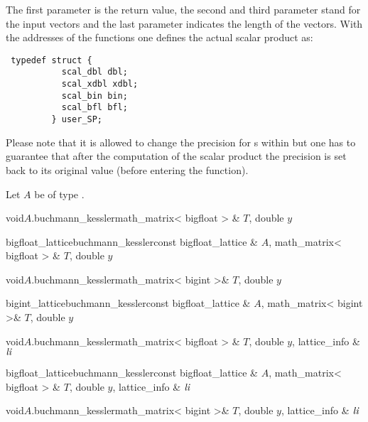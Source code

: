 The first parameter is the return value, the second and third parameter stand for the input
vectors and the last parameter indicates the length of the vectors.  With the addresses of the
functions one defines the actual scalar product as:
\begin{verbatim}
 typedef struct {
           scal_dbl dbl;
           scal_xdbl xdbl;
           scal_bin bin;
           scal_bfl bfl;
         } user_SP;
\end{verbatim}
Please note that it is allowed to change the precision for s within  but one has to guarantee that
after the computation of the scalar product the precision is set back to its original value
(before entering the function).

Let $A$ be of type .

\begin{fcode}{void}{$A$.buchmann_kessler}{math_matrix< bigfloat > & $T$, double $y$}
\end{fcode}

\begin{fcode}{bigfloat_lattice}{buchmann_kessler}{const bigfloat_lattice & $A$,
    math_matrix< bigfloat > & $T$, double $y$}%
\end{fcode}

\begin{fcode}{void}{$A$.buchmann_kessler}{math_matrix< bigint >& $T$, double $y$}
\end{fcode}

\begin{fcode}{bigint_lattice}{buchmann_kessler}{const bigfloat_lattice & $A$,
    math_matrix< bigint >& $T$, double $y$}%
\end{fcode}

\begin{fcode}{void}{$A$.buchmann_kessler}{math_matrix< bigfloat > & $T$, double $y$,
    lattice_info & $\mathit{li}$}%
\end{fcode}

\begin{fcode}{bigfloat_lattice}{buchmann_kessler}{const bigfloat_lattice & $A$,
    math_matrix< bigfloat > & $T$, double $y$, lattice_info & $\mathit{li}$}%
\end{fcode}

\begin{fcode}{void}{$A$.buchmann_kessler}{math_matrix< bigint >& $T$, double $y$,
    lattice_info & $\mathit{li}$}%
\end{fcode}


